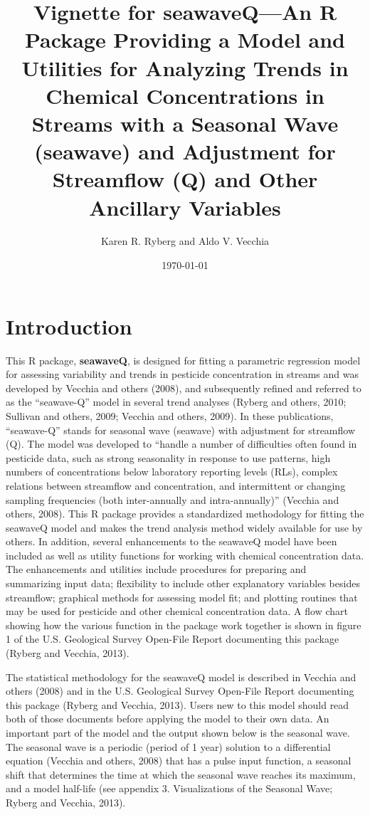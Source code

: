 \documentclass[11pt]{article}
\title{Vignette for seawaveQ---An R Package Providing a Model and Utilities for Analyzing Trends in Chemical Concentrations in Streams with a Seasonal Wave (seawave) and Adjustment for Streamflow (Q) and Other Ancillary Variables}
\author{Karen R. Ryberg and Aldo V. Vecchia}
\date{\today}                                %
\begin{document}
\maketitle
\tableofcontents

\section{Introduction}

This R package, \textbf{seawaveQ}, is designed  for fitting a parametric regression model for assessing variability and trends in pesticide concentration in streams and was developed by Vecchia and others (2008), and subsequently refined and referred to as the ``seawave-Q'' model in several trend analyses (Ryberg and others, 2010; Sullivan and others, 2009; Vecchia and others, 2009).  In these publications, ``seawave-Q'' stands for seasonal wave (seawave) with adjustment for streamflow (Q).  The model was developed to ``handle a number of difficulties often found in pesticide data, such as strong seasonality in response to use patterns, high numbers of concentrations below laboratory reporting levels (RLs), complex relations between streamflow and concentration, and intermittent or changing sampling frequencies (both inter-annually and intra-annually)'' (Vecchia and others, 2008).  This R package provides a standardized methodology for fitting the seawaveQ model and makes the trend analysis method widely available for use by others. In addition, several enhancements to the seawaveQ model have been included as well as utility functions for working with chemical concentration data.  The enhancements and utilities include procedures for preparing and summarizing input data; flexibility to include other explanatory variables besides streamflow; graphical methods for assessing model fit; and plotting routines that may be used for pesticide and other chemical concentration data.  A flow chart showing how the various function in the package work together is shown in figure 1 of the U.S. Geological Survey Open-File Report documenting this package (Ryberg and Vecchia, 2013). 

The statistical methodology for the seawaveQ model is described in Vecchia and others (2008) and in the U.S. Geological Survey Open-File Report documenting this package (Ryberg and Vecchia, 2013).   Users new to this model should read both of those documents before applying the model to their own data.  An important part of the model and the output shown below is the seasonal wave. The seasonal wave is a periodic (period of 1 year) solution to a differential equation (Vecchia and others, 2008) that has a pulse input function, a seasonal shift that determines the time at which the seasonal wave reaches its maximum, and a model half-life (see appendix 3.  Visualizations of the Seasonal Wave; Ryberg and Vecchia, 2013).
\end{document}
